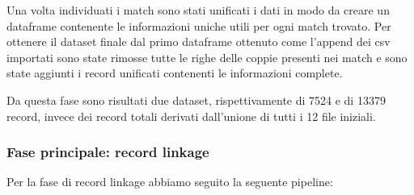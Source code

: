 \documentclass[a4paper,12pt]{article}
\begin{document}
Una volta individuati i match sono stati unificati i dati in modo da creare un dataframe contenente le informazioni uniche utili per ogni match trovato. Per ottenere il dataset finale dal primo dataframe ottenuto come l'append dei csv importati sono state rimosse tutte le righe delle coppie presenti nei match e sono state aggiunti i record unificati contenenti le informazioni complete.

Da questa fase sono risultati due dataset, rispettivamente di 7524 e di 13379 record, invece dei %
record totali derivati dall'unione di tutti i 12 file iniziali.

\subsubsection{Fase principale: record linkage}
Per la fase di record linkage abbiamo seguito la seguente pipeline: 
\end{document}
